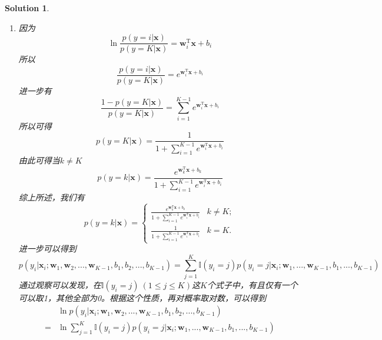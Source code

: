 \documentclass[a4paper,UTF8]{article}
\numberwithin{equation}{section}
\newtheorem*{solution}{Solution}
\begin{document}
\begin{solution}
\begin{enumerate}
	
\item
因为
\begin{equation}
	\ln\frac{p(y=i|\mathbf{x})}{p(y=K|\mathbf{x})}=\mathbf{w}_i^\mathrm{T}\mathbf{x}+b_i
\end{equation} 	
所以
\begin{equation}
	\frac{p(y=i|\mathbf{x})}{p(y=K|\mathbf{x})} = e^{\mathbf{w}_i^\mathrm{T}\mathbf{x}+b_i}
\end{equation}
进一步有
\begin{equation}
	\frac{1-p(y=K|\mathbf{x})}{p(y=K|\mathbf{x})} = \sum_{i=1}^{K-1}e^{\mathbf{w}_i^\mathrm{T}\mathbf{x}+b_i}
\end{equation}
所以可得
\begin{equation}
	p(y=K|\mathbf{x}) = \frac{1}{1 + \sum_{i=1}^{K-1}e^{\mathbf{w}_i^\mathrm{T}\mathbf{x}+b_i}}
\end{equation}
由此可得当$k\neq K$
\begin{equation}
	p(y=k|\mathbf{x}) = \frac{e^{\mathbf{w}_k^\mathrm{T}\mathbf{x}+b_k}}{1 + \sum_{i=1}^{K-1}e^{\mathbf{w}_i^\mathrm{T}\mathbf{x}+b_i}}
\end{equation}
综上所述，我们有
\begin{equation}
		p(y=k|\mathbf{x}) = \begin{cases}
		\frac{e^{\mathbf{w}_k^\mathrm{T}\mathbf{x}+b_k}}{1 + \sum_{i=1}^{K-1}e^{\mathbf{w}_i^\mathrm{T}\mathbf{x}+b_i}} & k\neq K;\\
		\frac{1}{1 + \sum_{i=1}^{K-1}e^{\mathbf{w}_i^\mathrm{T}\mathbf{x}+b_i}} & k = K.
		\end{cases}
\end{equation}
进一步可以得到
\begin{equation}
p(y_i|\mathbf{x}_i;\mathbf{w}_1, \mathbf{w}_2,...,\mathbf{w}_{K-1}, b_1, b_2,...,b_{K-1}) = \sum_{j=1}^{K}\mathbb{I}(y_i=j) p(y_i=j|\mathbf{x}_i;\mathbf{w}_1, ...,\mathbf{w}_{K-1}, b_1, ...,b_{K-1})
\end{equation}
通过观察可以发现，在$\mathbb{I}(y_i=j)\ (1 \leq j \leq K)$这$K$个式子中，有且仅有一个可以取1，其他全部为0。根据这个性质，再对概率取对数，可以得到
\begin{equation}
\begin{aligned}
&\ln p(y_i|\mathbf{x}_i;\mathbf{w}_1, \mathbf{w}_2,...,\mathbf{w}_{K-1}, b_1, b_2,...,b_{K-1})\\ 
=& \ln \sum_{j=1}^{K}\mathbb{I}(y_i=j) p(y_i=j|\mathbf{x}_i;\mathbf{w}_1,...,\mathbf{w}_{K-1}, b_1,...,b_{K-1})\\

\end{aligned}
\end{equation}
\end{enumerate}
\end{solution}
\end{document}
